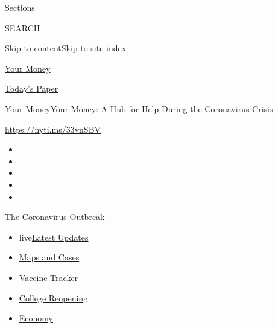 Sections

SEARCH

\protect\hyperlink{site-content}{Skip to
content}\protect\hyperlink{site-index}{Skip to site index}

\href{https://www.nytimes3xbfgragh.onion/section/your-money}{Your Money}

\href{https://myaccount.nytimes3xbfgragh.onion/auth/login?response_type=cookie\&client_id=vi}{}

\href{https://www.nytimes3xbfgragh.onion/section/todayspaper}{Today's
Paper}

\href{/section/your-money}{Your Money}\textbar{}Your Money: A Hub for
Help During the Coronavirus Crisis

\url{https://nyti.ms/33vnSBV}

\begin{itemize}
\item
\item
\item
\item
\item
\end{itemize}

\href{https://www.nytimes3xbfgragh.onion/news-event/coronavirus?action=click\&pgtype=Article\&state=default\&region=TOP_BANNER\&context=storylines_menu}{The
Coronavirus Outbreak}

\begin{itemize}
\tightlist
\item
  live\href{https://www.nytimes3xbfgragh.onion/2020/08/04/world/coronavirus-cases.html?action=click\&pgtype=Article\&state=default\&region=TOP_BANNER\&context=storylines_menu}{Latest
  Updates}
\item
  \href{https://www.nytimes3xbfgragh.onion/interactive/2020/us/coronavirus-us-cases.html?action=click\&pgtype=Article\&state=default\&region=TOP_BANNER\&context=storylines_menu}{Maps
  and Cases}
\item
  \href{https://www.nytimes3xbfgragh.onion/interactive/2020/science/coronavirus-vaccine-tracker.html?action=click\&pgtype=Article\&state=default\&region=TOP_BANNER\&context=storylines_menu}{Vaccine
  Tracker}
\item
  \href{https://www.nytimes3xbfgragh.onion/2020/08/02/us/covid-college-reopening.html?action=click\&pgtype=Article\&state=default\&region=TOP_BANNER\&context=storylines_menu}{College
  Reopening}
\item
  \href{https://www.nytimes3xbfgragh.onion/live/2020/08/04/business/stock-market-today-coronavirus?action=click\&pgtype=Article\&state=default\&region=TOP_BANNER\&context=storylines_menu}{Economy}
\end{itemize}

